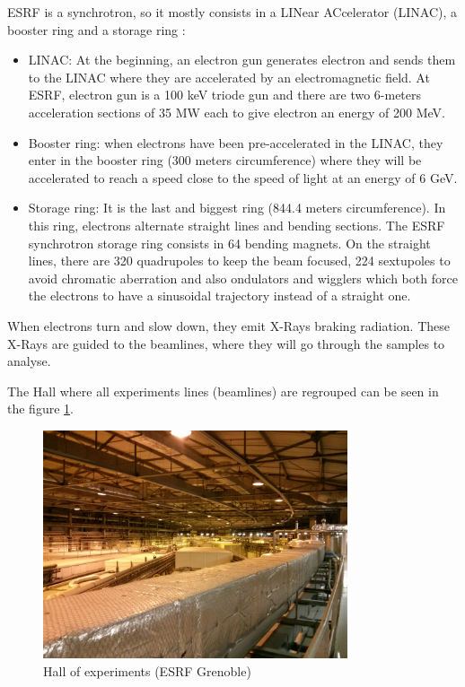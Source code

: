 \documentclass[11pt,a4paper,oneside]{report}
\begin{document}
ESRF is a synchrotron, so it mostly consists in a LINear ACcelerator (LINAC), a booster ring and a storage ring :
\begin{itemize}
    \item LINAC: At the beginning, an electron gun generates electron and sends them to the LINAC where they are accelerated by an electromagnetic field. At ESRF, electron gun is a 100 keV triode gun and there are two 6-meters acceleration sections of 35 MW each to give electron an energy of 200 MeV.
    \item Booster ring: when electrons have been pre-accelerated in the LINAC, they enter in the booster ring (300 meters circumference) where they will be accelerated to reach a speed close to  the speed of light at an energy of 6 GeV.
    \item Storage ring: It is the last and biggest ring (844.4 meters circumference). In this ring, electrons alternate straight lines and bending sections. The ESRF synchrotron storage ring consists in 64 bending magnets. On the straight lines, there are 320 quadrupoles to keep the beam focused, 224 sextupoles to avoid chromatic aberration and also ondulators and wigglers which both force the electrons to have a sinusoidal trajectory instead of a straight one.
\end{itemize}

When electrons turn and slow down, they emit X-Rays braking radiation. These X-Rays are guided to the beamlines, where they will go through the samples to analyse.

The Hall where all experiments lines (beamlines) are regrouped can be seen in the figure \ref{Hall}.

\begin{figure}[H]
    \begin{center}
        \includegraphics[width=0.8\textwidth]{Images/IMG_20151210_213319.jpg}
        \caption{Hall of experiments (ESRF Grenoble)}
        \label{Hall}
    \end{center}
\end{figure}
\end{document}
